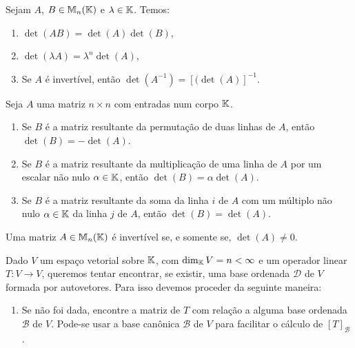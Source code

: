 \documentclass{beamer}
\begin{document}
    \begin{frame}
        \begin{proposicao}
            Sejam $A$, $B \in \mathbb{M}_n(\mathbb{K})$ \pause e $\lambda \in \mathbb{K}$. \pause Temos:\pause
            \begin{enumerate}[label={\roman*})]
                \item $\det(AB) = \det(A) \det(B)$,\pause
                \item $\det(\lambda A) = \lambda^n \det(A)$,\pause
                \item Se $A$ é invertível, \pause então $\det(A^{-1}) = [(\det(A)]^{-1}$.
            \end{enumerate}
        \end{proposicao}
    \end{frame}

    \begin{frame}
        \begin{proposicao}
            Seja $A$ uma matriz $n \times n$ \pause com entradas num corpo $\mathbb{K}$.\pause
            \begin{enumerate}[label={\roman*})]
                \item Se $B$ é a matriz resultante da permutação de duas linhas de $A$, \pause então $\det (B) = -\det (A)$.\pause
                \item Se $B$ é a matriz resultante da multiplicação de uma linha de $A$ \pause por um escalar não nulo $\alpha \in \mathbb{K}$, \pause então $\det(B) = \alpha\det(A)$.\pause
                \item Se $B$ é a matriz resultante da soma da linha $i$ de $A$ \pause com um múltiplo não nulo \pause $\alpha \in \mathbb{K}$ da linha $j$ de $A$, \pause então $\det(B) = \det(A)$.
            \end{enumerate}
        \end{proposicao}
    \end{frame}

    \begin{frame}
        \begin{teorema}
            Uma matriz $A \in \mathbb{M}_n(\mathbb{K})$ \pause é invertível se, \pause e somente se, $\det(A) \ne 0$.
        \end{teorema}
    \end{frame}

    \begin{frame}
        Dado $V$ um espaço vetorial sobre $\mathbb{K}$, \pause com $\dim_{\mathbb{K}} V = n < \infty$ \pause e um operador linear $T \colon V \to V$, \pause queremos tentar encontrar, se existir, \pause uma base ordenada $\mathcal{D}$ de $V$ \pause formada por autovetores. \pause Para isso devemos proceder da seguinte maneira:\pause
        \begin{enumerate}[label={\arabic*})]
            \item Se não foi dada, \pause encontre a matriz de $T$ com relação a alguma base ordenada $\mathcal{B}$ de $V$. \pause Pode-se usar a base canônica $\mathcal{B}$ \pause de $V$ para facilitar o cálculo de $[T]_\mathcal{B}$.
            \seti
        \end{enumerate}
    \end{frame}
\end{document}
